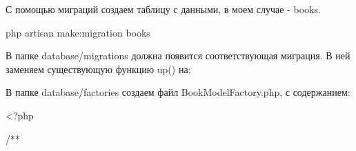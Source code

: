 С помощью миграций создаем таблицу с данными, в моем случае -\/ books. \begin{DoxyVerb}php artisan make:migration books
\end{DoxyVerb}


В папке database/migrations должна появится соответствующая миграция. В ней заменяем существующую функцию up() на\+: 


В папке database/factories создаем файл Book\+Model\+Factory.\+php, с содержанием\+: \begin{DoxyVerb}<?php

/**\end{DoxyVerb}
 